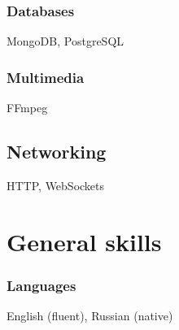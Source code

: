 \documentclass[a4paper,11pt]{article}
\begin{document}
\subsubsection{Databases}
MongoDB, PostgreSQL

\subsubsection{Multimedia}
FFmpeg

\subsection{Networking}
HTTP, WebSockets

\section{General skills}

\subsubsection{Languages}
English (fluent), Russian (native)
\end{document}
